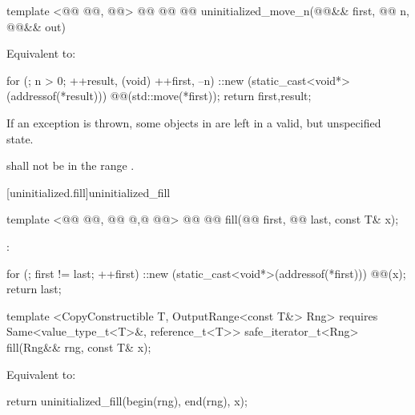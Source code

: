 \begin{codeblock}
  template <@@ @@, @@>
    @@
             @@
  @@
    uninitialized_move_n(@@&& first, @@ n, @@&& out)
\end{codeblock}


\pnum
\effects Equivalent to:
\begin{codeblock}
        for (; n > 0; ++result, (void) ++first, --n)
          ::new (static_cast<void*>(addressof(*result)))
            @@(std::move(*first));
        return {first,result};
\end{codeblock}

\pnum
\remarks If an exception is thrown, some objects in \tcode{[first, next(first, n))} are left in a valid, but unspecified state.

{\color{newclr}
\pnum
\requires {} shall not be in the range \tcode{[first, next(first, n))}.
} %

[uninitialized.fill]{uninitialized_fill}
\begin{codeblock}
  template <@@ @@, @@ @,@
            @@>
    @@
    @@ fill(@@ first, @@ last, const T& x);
\end{codeblock}

\setcounter{Paras}{0}
\pnum
\effects {}:
\begin{codeblock}
        for (; first != last; ++first)
           ::new (static_cast<void*>(addressof(*first)))
              @@(x);
        return last;
\end{codeblock}
{\color{newclr}
\begin{codeblock}
  template <CopyConstructible T, OutputRange<const T&> Rng>
    requires Same<value_type_t<T>&, reference_t<T>>
  safe_iterator_t<Rng>
    fill(Rng&& rng, const T& x);
\end{codeblock}

\pnum
\effects Equivalent to:
\begin{codeblock}
        return uninitialized_fill(begin(rng), end(rng), x);
\end{codeblock}
} %

